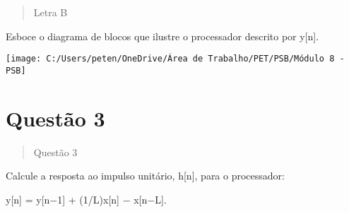 \documentclass[
]{article}
\begin{document}
\begin{quote}
Letra B
\end{quote}

Esboce o diagrama de blocos que ilustre o processador descrito por
y{[}n{]}.

\begin{center}
\texttt{[image: C:/Users/peten/OneDrive/Área de Trabalho/PET/PSB/Módulo 8 - PSB]}\\[2cm]
\end{center}

\newpage
\section*{Questão 3}

\begin{quote}
Questão 3
\end{quote}

Calcule a resposta ao impulso unitário, h{[}n{]}, para o processador:

y{[}n{]} = y{[}n−1{]} + (1/L)x{[}n{]} − x{[}n−L{]}.
\end{document}
